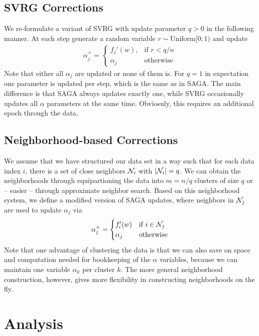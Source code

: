 \documentclass{article}
\begin{document}
\subsection{SVRG Corrections}

We re-formulate a variant of SVRG with update parameter $q >0$ in the following manner. At each step generate a random variable $r \sim \text{Uniform}[0;1)$ and update 
\begin{align}
\alpha_j^+  = 
\begin{cases}
f_j'(w), & \text{if $r < q/n$} \\
\alpha_j & \text{otherwise}
\end{cases}
\end{align}
Note that either all $\alpha_j$ are updated or none of them is. For $q=1$ in expectation one parameter is updated per step, which is the same as in SAGA. The main difference is that SAGA always updates exactly one, while SVRG occasionally updates all $\alpha$ parameters at the same time. Obviosuly, this requires an additional epoch through the data. 

\subsection{Neighborhood-based Corrections}

We assume that we have structured our data set in a way such that for each data index $i$, there is a set of close neighbors ${\cal N}_i$ with $| {\cal N}_i|=q$. We can obtain the neighborhoods through equipartioning the data into $m=n/q$ clusters of size $q$ or -- easier -- through approximate neighbor search. Based on this neighborhood system, we define a modified version of SAGA updates, where neighbors in ${\cal N}_j$ are used to update $\alpha_j$ via 
\begin{align}
\alpha^+_j  = 
\begin{cases}
f'_i(w) & \text{if $i \in {\cal N}_j$} \\
\alpha_j & \text{otherwise}
\end{cases}
\end{align} 
%
Note that one advantage of clustering the data is that we can also save on space and computation needed for bookkeeping of the $\alpha$ variables, because we can maintain one variable $\alpha_k$ per cluster $k$. The more general neighborhood construction, however, gives more flexibility in constructing neighborhoods on the fly. 

\section{Analysis}
\end{document}
